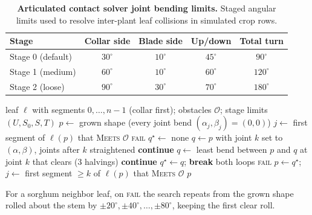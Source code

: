 \documentclass[10pt,twocolumn,letterpaper]{article}
\newcommand{\Meets}{\textsc{Meets}}
\begin{document}
\begin{table}[h]
  \caption{\textbf{Articulated contact solver joint bending limits.} Staged angular limits used to resolve inter-plant leaf collisions in simulated crop rows.}
  \label{tab:supp-stages}\label{tab:supp-solver_limits}
  \centering\scriptsize
  \setlength{\tabcolsep}{3pt}
  \begin{tabular}{lcccc}
  \toprule
  Stage & Collar side & Blade side & Up/down & Total turn \\
  \midrule
  Stage 0 (default) & $30^\circ$ & $10^\circ$ & $45^\circ$ & $90^\circ$ \\
  Stage 1 (medium)  & $60^\circ$ & $10^\circ$ & $60^\circ$ & $120^\circ$ \\
  Stage 2 (loose)   & $90^\circ$ & $30^\circ$ & $70^\circ$ & $180^\circ$ \\
  \bottomrule
  \end{tabular}
\end{table}

\begin{algorithm}[t]
\caption{\textsc{BendClear}: Minimum-deviation collision-free leaf shape}\label{alg:supp-bend}
\footnotesize
\begin{algorithmic}[1]
\Require leaf $\ell$ with segments $0,\dots,n{-}1$ (collar first); obstacles $\mathcal O$; stage limits $(U,S_0,S,T)$
\State $p \gets$ grown shape (every joint bend $(\alpha_j,\beta_j)=(0,0)$)
\State $j \gets$ first segment of $\ell(p)$ that \Meets{} $\mathcal O$ 
   \Return \textsc{fail} \EndIf
  \State $q^\star \gets$ none
   
      \State $q \gets p$ with joint $k$ set to $(\alpha,\beta)$, joints after $k$ straightened
      \If{$\sum_i \|(\alpha_i,\beta_i)\| > T$ \textbf{or} segs.\ $k..j$ of $\ell(q)$ \Meets{} $\mathcal O$}
        \State \textbf{continue}
      \EndIf
      \State $q \gets$ least bend between $p$ and $q$ at joint $k$ that clears (3 halvings)
        \State \textbf{continue}
      \EndIf
      \State $q^\star \gets q$; \textbf{break} both loops
    \EndFor
  \EndFor
   \Return \textsc{fail} \EndIf
  \State $p \gets q^\star$; \quad $j \gets$ first segment $\ge k$ of $\ell(p)$ that \Meets{} $\mathcal O$
\EndWhile
\State \Return $p$
\end{algorithmic}
\noindent\footnotesize For a sorghum neighbor leaf, on \textsc{fail} the search repeats from the grown shape rolled about the stem by $\pm20^\circ,\pm40^\circ,\dots,\pm80^\circ$, keeping the first clear roll.
\end{algorithm}
\end{document}
